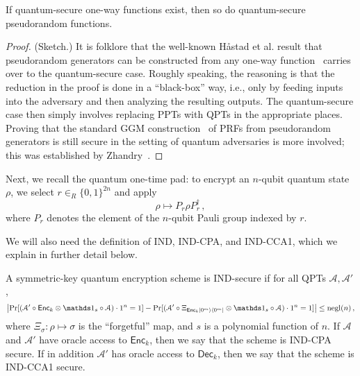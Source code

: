 \documentclass[envcountsame]{llncs}
\numberwithin{equation}{section}
\newcommand{\one}{\mathds 1}
\newcommand{\opn}{\operatorname}
\newcommand{\algo}{\mathcal}
\newcommand{\negl}{\opn{negl}}
\newcommand{\Enc}{\ensuremath{\mathsf{Enc}}\xspace}
\newcommand{\Dec}{\ensuremath{\mathsf{Dec}}\xspace}
\newcommand{\inrand}{\in_R}
\newcommand{\prob}{\opn{Pr}}
\begin{document}
\begin{theorem}\label{thm:qOWF-implies-qPRF-app}
If quantum-secure one-way functions exist, then so do quantum-secure pseudorandom functions.
\end{theorem}
\begin{proof} (Sketch.) It is folklore that the well-known H{\aa}stad et al. result that pseudorandom generators can be constructed from any one-way function~\cite{HILL99} carries over to the quantum-secure case. Roughly speaking, the reasoning is that the reduction in the proof is done in a ``black-box'' way, i.e., only by feeding inputs into the adversary and then analyzing the resulting outputs. The quantum-secure case then simply involves replacing PPTs with QPTs in the appropriate places. Proving that the standard GGM construction~\cite{GGM86} of PRFs from pseudorandom generators is still secure in the setting of quantum adversaries is more involved; this was established by Zhandry~\cite{Zhandry2012}.
\end{proof}

Next, we recall the quantum one-time pad: to encrypt an $n$-qubit quantum state $\rho$, we select $r \inrand \{0,1\}^{2n}$ and apply
\begin{equation}\label{eq:quantum-one-time-pad-app}
\rho \longmapsto P_r \rho P_r^\dagger\,,
\end{equation}
where $P_r$ denotes the element of the $n$-qubit Pauli group indexed by $r$. 

We will also need the definition of IND, IND-CPA, and IND-CCA1, which we explain in further detail below.

\begin{definition}\label{def:IND-app}
A symmetric-key quantum encryption scheme is IND-secure if for all QPTs $\algo A, \algo A'$,
$$
\left|\prob[ (\algo A' \circ \Enc_k \otimes \one_s \circ \algo A) \cdot 1^n = 1] -
\prob[ (\algo A' \circ \Xi_{\Enc_k \ket{0^m}\bra{0^m}} \otimes \one_s \circ \algo A) \cdot 1^n = 1] \right|
\leq \negl(n)\,,
$$ 
where $\Xi_\sigma: \rho \mapsto \sigma$ is the ``forgetful'' map, and $s$ is a polynomial function of $n$. If $\algo A$ and $\algo A'$ have oracle access to $\Enc_k$, then we say that the scheme is IND-CPA secure. If in addition $\algo A'$ has oracle access to $\Dec_k$, then we say that the scheme is IND-CCA1 secure.
\end{definition}
\end{document}
